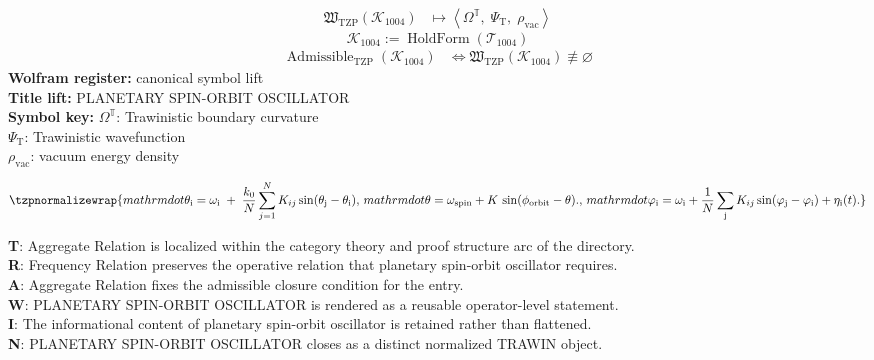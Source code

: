 \noindent
\begin{minipage}[t]{0.48\linewidth}
\begingroup
\small
\[
\begin{aligned}
\mathfrak{W}_{\mathrm{TZP}}\!\left(\mathcal{K}_{1004}\right)
&\longmapsto
\left\langle \Omega^{\mathbb{T}},\; \Psi_{\mathrm{T}},\; \rho_{\mathrm{vac}} \right\rangle
\end{aligned}
\]
\[
\mathcal{K}_{1004}
:=
\operatorname{HoldForm}\!\left(\mathcal{T}_{1004}\right)
\]
\[
\begin{aligned}
\operatorname{Admissible}_{\mathrm{TZP}}\!\left(\mathcal{K}_{1004}\right)
&\Longleftrightarrow
\mathfrak{W}_{\mathrm{TZP}}\!\left(\mathcal{K}_{1004}\right)\not\equiv\varnothing
\end{aligned}
\]
\textbf{Wolfram register:} canonical symbol lift\\
\textbf{Title lift:} PLANETARY SPIN-ORBIT OSCILLATOR\\
\textbf{Symbol key:} \(\Omega^{\mathbb{T}}\): Trawinistic boundary curvature\\ \(\Psi_{\mathrm{T}}\): Trawinistic wavefunction\\ \(\rho_{\mathrm{vac}}\): vacuum energy density
\par
\endgroup
\end{minipage}\hfill
\begin{minipage}[t]{0.48\linewidth}
\[
\tzpnormalizewrap{mathrm{dot}\theta_{\mathrm{i}} = \omega_{\mathrm{i}} \;+\; \frac{k_0}{N}\sum_{j=1}^N K_{ij}\sin(\theta_{\mathrm{j}}-\theta_{\mathrm{i}}),\,mathrm{dot}{\theta} = \omega_{\text{spin}} + K\,\sin(\phi_{\text{orbit}} - \theta).,\,mathrm{dot}\varphi_{\mathrm{i}} = \omega_{\mathrm{i}} + \frac{1}{N}\sum_{\mathrm{j}} K_{ij}\sin(\varphi_{\mathrm{j}}-\varphi_{\mathrm{i}}) + \eta_{\mathrm{i}}(t).}
\]

\small
\textbf{T}: Aggregate Relation is localized within the category theory and proof structure arc of the directory.\\
\textbf{R}: Frequency Relation preserves the operative relation that planetary spin-orbit oscillator requires.\\
\textbf{A}: Aggregate Relation fixes the admissible closure condition for the entry.\\
\textbf{W}: PLANETARY SPIN-ORBIT OSCILLATOR is rendered as a reusable operator-level statement.\\
\textbf{I}: The informational content of planetary spin-orbit oscillator is retained rather than flattened.\\
\textbf{N}: PLANETARY SPIN-ORBIT OSCILLATOR closes as a distinct normalized TRAWIN object.
\normalsize
\end{minipage}

